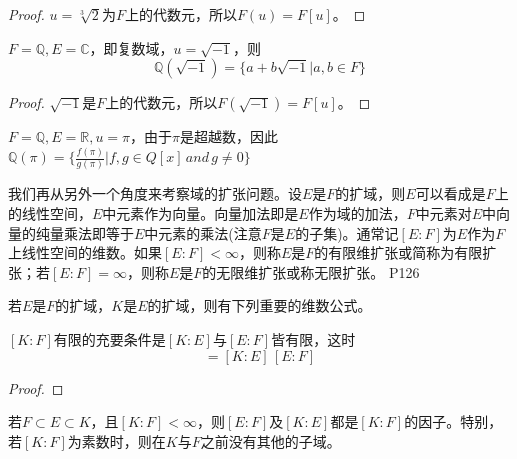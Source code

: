 \begin{proof}
	$u=\sqrt[3]{2}$为$F$上的代数元，所以$F(u)=F[u]$。
\end{proof}

\begin{example}
	$F=\mathbb{Q},E=\mathbb{C}$，即复数域，$u=\sqrt{-1}$，则
	\begin{equation*}
		\mathbb{Q}(\sqrt{-1})=\{a+b\sqrt{-1}\big| a,b\in F\}
	\end{equation*}
\end{example}

\begin{proof}
	$\sqrt{-1}$是$F$上的代数元，所以$F(\sqrt{-1})=F[u]$。
\end{proof}

\begin{example}
	$F=\mathbb{Q},E=\mathbb{R},u=\pi$，由于$\pi$是超越数，因此$\mathbb{Q}(\pi)=\{\frac{f(\pi)}{g(\pi)}\big| f,g\in Q[x]\,and\,g\neq 0\}$
\end{example}

\original
{
	我们再从另外一个角度来考察域的扩张问题。设$E$是$F$的扩域，则$E$可以看成是$F$上的线性空间，$E$中元素作为向量。向量加法即是$E$作为域的加法，$F$中元素对$E$中向量的纯量乘法即等于$E$中元素的乘法(注意$F$是$E$的子集)。通常记$[E:F]$为$E$作为$F$上线性空间的维数。如果$[E:F]<\infty$，则称$E$是$F$的有限维扩张或简称为有限扩张；若$[E:F]=\infty$，则称$E$是$F$的无限维扩张或称无限扩张。
}
{P126}
\par 若$E$是$F$的扩域，$K$是$E$的扩域，则有下列重要的维数公式。
\begin{theorem}
	$[K:F]$有限的充要条件是$[K:E]$与$[E:F]$皆有限，这时
	\begin{equation*}
		[K:F]=[K:E]\,[E:F]
	\end{equation*}
\end{theorem}

\begin{proof}
	
\end{proof}


\begin{corollary}
	若$F\subset E\subset K$，且$[K:F]<\infty$，则$[E:F]$及$[K:E]$都是$[K:F]$的因子。特别，若$[K:F]$为素数时，则在$K$与$F$之前没有其他的子域。
\end{corollary}

